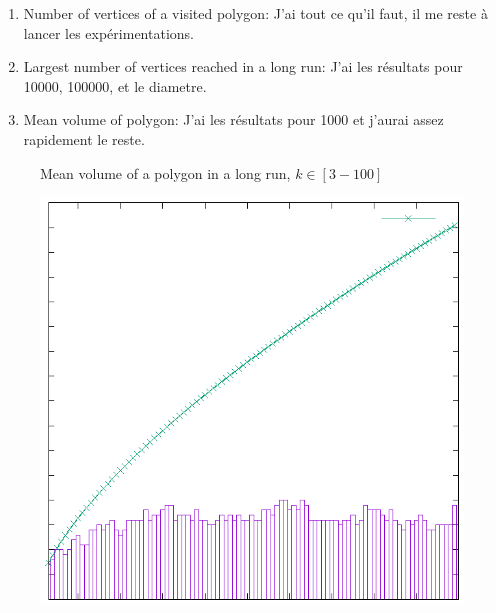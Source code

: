\documentclass[a4paper]{article}
\begin{document}
\begin{enumerate}
  \item Number of vertices of a visited polygon: J'ai tout ce qu'il faut, il me reste à lancer les expérimentations.

  \item Largest number of vertices reached in a long run: J'ai les résultats pour 10000, 100000, et le diametre.

  \item Mean volume of polygon: J'ai les résultats pour 1000 et j'aurai assez rapidement le reste.
\end{enumerate}

\begin{figure}
  \begin{center}
    \begin{minipage}[c]{.4\linewidth}
      \resizebox{\columnwidth}{!}{}
    \end{minipage}
    \begin{minipage}[c]{.4\linewidth}
      \resizebox{\columnwidth}{!}{}
    \end{minipage}
    \caption{Mean volume of a polygon in a long run, $k \in [3-100]$}
    \label{10krun}
  \end{center}
\end{figure}

\begin{figure}
  \includegraphics{largestSize_1000}
  \caption{}
  \label{}
\end{figure}
\end{document}
